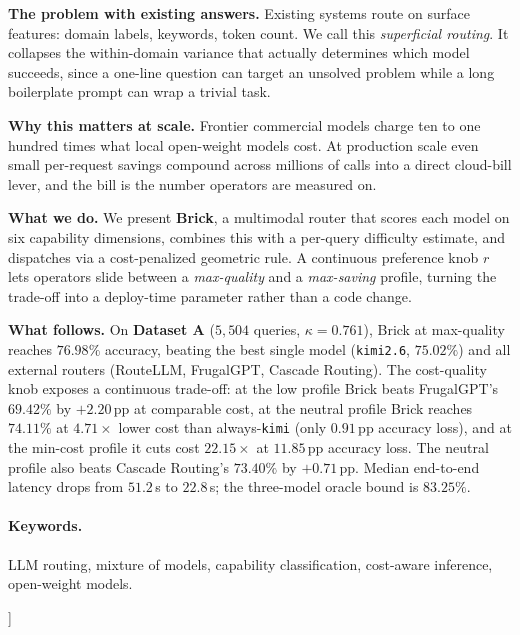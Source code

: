 \documentclass[twocolumn,10pt,a4paper]{article}
\begin{document}
\begin{@twocolumnfalse}
    \vspace{4pt}\noindent \textbf{The problem with existing answers.} Existing systems route on surface features: domain labels, keywords, token count. We call this \emph{superficial routing}. It collapses the within-domain variance that actually determines which model succeeds, since a one-line question can target an unsolved problem while a long boilerplate prompt can wrap a trivial task.

    \vspace{4pt}\noindent \textbf{Why this matters at scale.} Frontier commercial models charge ten to one hundred times what local open-weight models cost. At production scale even small per-request savings compound across millions of calls into a direct cloud-bill lever, and the bill is the number operators are measured on.

    \vspace{4pt}\noindent \textbf{What we do.} We present \textbf{Brick}, a multimodal router that scores each model on six capability dimensions, combines this with a per-query difficulty estimate, and dispatches via a cost-penalized geometric rule. A continuous preference knob $r$ lets operators slide between a \emph{max-quality} and a \emph{max-saving} profile, turning the trade-off into a deploy-time parameter rather than a code change.

    \vspace{4pt}\noindent \textbf{What follows.} On \textbf{Dataset A} ($5{,}504$ queries, $\kappa{=}0.761$), Brick at max-quality reaches $\mathbf{76.98\%}$ accuracy, beating the best single model (\texttt{kimi2.6}, $75.02\%$) and all external routers (RouteLLM, FrugalGPT, Cascade Routing). The cost-quality knob exposes a continuous trade-off: at the low profile Brick beats FrugalGPT's $69.42\%$ by $+2.20$\,pp at comparable cost, at the neutral profile Brick reaches $\mathbf{74.11\%}$ at $\mathbf{4.71{\times}}$ lower cost than always-\texttt{kimi} (only $0.91$\,pp accuracy loss), and at the min-cost profile it cuts cost $\mathbf{22.15{\times}}$ at $11.85$\,pp accuracy loss. The neutral profile also beats Cascade Routing's $73.40\%$ by $+0.71$\,pp. Median end-to-end latency drops from $51.2$\,s to $22.8$\,s; the three-model oracle bound is $83.25\%$.

    \medskip
    \paragraph{Keywords.} LLM routing, mixture of models, capability classification, cost-aware inference, open-weight models.
    \vspace{10pt}
  \end{@twocolumnfalse}%
]
\end{document}
